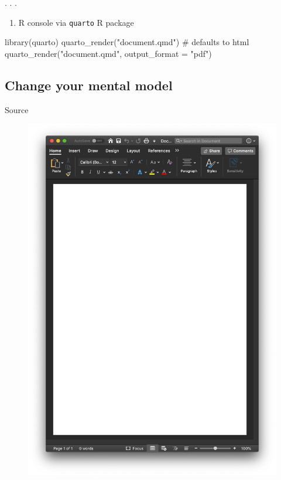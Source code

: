 \documentclass[
  letterpaper,
  DIV=11,
  numbers=noendperiod]{scrartcl}
\newenvironment{Shaded}{\begin{snugshade}}{\end{snugshade}}
\newcommand{\AttributeTok}[1]{\textcolor[rgb]{0.40,0.45,0.13}{#1}}
\newcommand{\CommentTok}[1]{\textcolor[rgb]{0.37,0.37,0.37}{#1}}
\newcommand{\FunctionTok}[1]{\textcolor[rgb]{0.28,0.35,0.67}{#1}}
\newcommand{\NormalTok}[1]{\textcolor[rgb]{0.00,0.23,0.31}{#1}}
\newcommand{\StringTok}[1]{\textcolor[rgb]{0.13,0.47,0.30}{#1}}
\providecommand{\tightlist}{%
  \setlength{\itemsep}{0pt}\setlength{\parskip}{0pt}}\usepackage{longtable,booktabs,array}
\begin{document}
. . .

\begin{enumerate}
\def\labelenumi{\arabic{enumi}.}
\setcounter{enumi}{2}
\tightlist
\item
  R console via \texttt{quarto} R package
\end{enumerate}

\begin{Shaded}
\begin{Highlighting}[]
\FunctionTok{library}\NormalTok{(quarto)}
\FunctionTok{quarto\_render}\NormalTok{(}\StringTok{"document.qmd"}\NormalTok{) }\CommentTok{\# defaults to html}
\FunctionTok{quarto\_render}\NormalTok{(}\StringTok{"document.qmd"}\NormalTok{, }\AttributeTok{output\_format =} \StringTok{"pdf"}\NormalTok{)}
\end{Highlighting}
\end{Shaded}

\hypertarget{change-your-mental-model}{%
\subsection{Change your mental model}\label{change-your-mental-model}}

Source

\begin{figure}

{\centering \includegraphics[width=4.6875in,height=\textheight]{images/word.png}

}

\end{figure}
\end{document}
